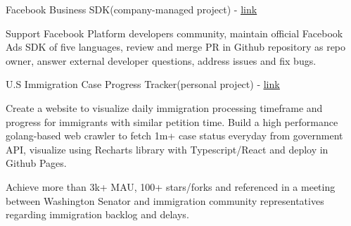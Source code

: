 


\begin{cventries}


\compactcventry
{Facebook Business SDK(company-managed project) - \underline{\href{https://github.com/facebook/facebook-python-business-sdk}{link}}}
{} %
{
\begin{cvitems}
	\item{Support Facebook Platform developers community, maintain official Facebook Ads SDK of five languages, review and merge PR in Github repository as repo owner, answer external developer questions, address issues and fix bugs.}
\end{cvitems}
}

\compactcventry
{U.S Immigration Case Progress Tracker(personal project) - \underline{\href{https://github.com/vicdus/uscis-case-statistics/}{link}}}
{} %
{
\begin{cvitems}
\item{Create a website to visualize daily immigration processing timeframe and progress for immigrants with similar petition time. Build a high performance golang-based web crawler to fetch 1m+ case status everyday from government API, visualize using Recharts library with Typescript/React and deploy in Github Pages.}
\item{Achieve more than 3k+ MAU, 100+ stars/forks and referenced in a meeting between Washington Senator and immigration community representatives regarding immigration backlog and delays.}
\end{cvitems}
}






\end{cventries}
